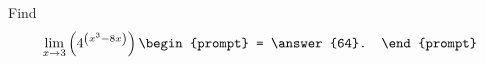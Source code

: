 \documentclass{ximera}
\author{Gregory Hartman \and Matthew Carr}
\begin{document}
\begin{exercise}




Find 
\[
\lim_{x\to3}\left({4^{\left({x^3-8x}\right)}}\right)
\begin{prompt}
= \answer{64}.
\end{prompt}
\]

\end{exercise}
\end{document}
